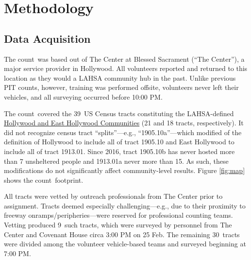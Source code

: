 \documentclass[11pt,twocolumn]{article}
\def\Count{count}
\def\ntracts{39}
\def\nprof{9}
\def\nvol{30}
\def\resp{respectively}
\begin{document}
\section{Methodology}
\label{sec:procedure}
%
%

\subsection{Data Acquisition}
\label{sec:acquisition}

The \Count\ was based out of The Center at Blessed Sacrament (``The Center''), a major service 
provider in Hollywood. All volunteers reported and returned to this location as they would a LAHSA 
community hub in the past. Unlike previous PIT counts, however, training was performed offsite, 
volunteers never left their vehicles, and all surveying occurred before 10:00 PM.

The \Count\ covered the \ntracts\ US Census tracts constituting the LAHSA-defined 
\href{https://www.lahsa.org/data?id=45-2020-homeless-count-by-community-city}{Hollywood 
and East Hollywood Communities} (21 and 18 tracts, \resp). It did not recognize census 
tract ``splits''---e.g., ``1905.10a''---which modified of the definition of Hollywood to include 
all of tract 1905.10 and East Hollywood to include all of tract 1913.01. Since 2016, tract 1905.10b 
has never hosted more than 7 unsheltered people and 1913.01a never more than 15. As such,
these modifications do not significantly affect community-level results.
Figure \ref{fig:map} shows the \Count\ footprint.

All tracts were vetted by outreach professionals from The Center prior to assignment. Tracts 
deemed especially challenging---e.g., due to their proximity to freeway onramps/peripheries---were 
reserved for professional counting teams. Vetting produced \nprof\ such tracts, which were surveyed 
by personnel from The Center and Covenant House circa 3:00 PM on 25 Feb. The remaining \nvol\ 
tracts were divided among the volunteer vehicle-based teams and surveyed beginning at 7:00 PM. 
\end{document}
